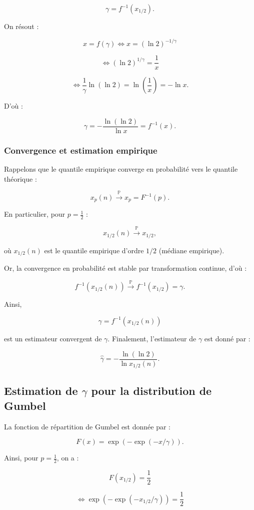 \documentclass{article}
\begin{document}
\[
\gamma = f^{-1}(x_{1/2}).
\]

On résout :

\[
x = f(\gamma) \iff x = (\ln 2)^{-1/\gamma}
\]

\[
\iff (\ln 2)^{1/\gamma} = \frac{1}{x}
\]

\[
\iff \frac{1}{\gamma} \ln (\ln 2) = \ln \left(\frac{1}{x}\right) = -\ln x.
\]

D'où :

\[
\gamma = -\frac{\ln (\ln 2)}{\ln x} = f^{-1}(x).
\]

\subsubsection{Convergence et estimation empirique}

Rappelons que le quantile empirique converge en probabilité vers le quantile théorique :

\[
x_p(n) \xrightarrow{\mathbb{P}} x_p = F^{-1}(p).
\]

En particulier, pour \(p = \frac{1}{2}\) :

\[
x_{1/2}(n) \xrightarrow{\mathbb{P}} x_{1/2},
\]

où \(x_{1/2}(n)\) est le quantile empirique d'ordre \(1/2\) (médiane empirique).  

Or, la convergence en probabilité est stable par transformation continue, d'où :

\[
f^{-1}(x_{1/2}(n)) \xrightarrow{\mathbb{P}} f^{-1}(x_{1/2}) = \gamma.
\]

Ainsi, 

\[
\gamma = f^{-1}(x_{1/2}(n))
\]

est un estimateur convergent de \(\gamma\).  
Finalement, l'estimateur de \(\gamma\) est donné par :

\[
\hat{\gamma} = -\frac{\ln (\ln 2)}{\ln x_{1/2}(n)}.
\]
\subsection{Estimation de \(\gamma\) pour la distribution de Gumbel}

La fonction de répartition de Gumbel est donnée par :

\[
F(x) = \exp(-\exp(-x/\gamma)).
\]

Ainsi, pour \(p = \frac{1}{2}\), on a :

\[
F(x_{1/2}) = \frac{1}{2}
\]

\[
\iff \exp(-\exp(-x_{1/2}/\gamma)) = \frac{1}{2}
\]
\end{document}
